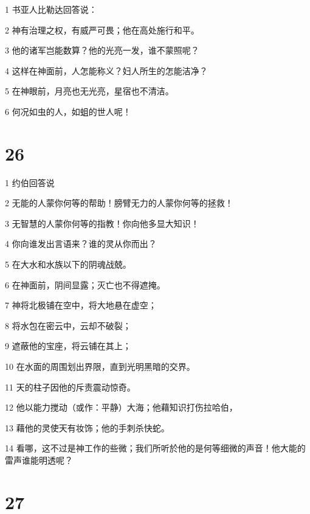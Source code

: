 \par 1 书亚人比勒达回答说：
\par 2 神有治理之权，有威严可畏；他在高处施行和平。
\par 3 他的诸军岂能数算？他的光亮一发，谁不蒙照呢？
\par 4 这样在神面前，人怎能称义？妇人所生的怎能洁净？
\par 5 在神眼前，月亮也无光亮，星宿也不清洁。
\par 6 何况如虫的人，如蛆的世人呢！

\chapter{26}

\par 1 约伯回答说
\par 2 无能的人蒙你何等的帮助！膀臂无力的人蒙你何等的拯救！
\par 3 无智慧的人蒙你何等的指教！你向他多显大知识！
\par 4 你向谁发出言语来？谁的灵从你而出？
\par 5 在大水和水族以下的阴魂战兢。
\par 6 在神面前，阴间显露；灭亡也不得遮掩。
\par 7 神将北极铺在空中，将大地悬在虚空；
\par 8 将水包在密云中，云却不破裂；
\par 9 遮蔽他的宝座，将云铺在其上；
\par 10 在水面的周围划出界限，直到光明黑暗的交界。
\par 11 天的柱子因他的斥责震动惊奇。
\par 12 他以能力搅动（或作：平静）大海；他藉知识打伤拉哈伯，
\par 13 藉他的灵使天有妆饰；他的手刺杀快蛇。
\par 14 看哪，这不过是神工作的些微；我们所听於他的是何等细微的声音！他大能的雷声谁能明透呢？

\chapter{27}

